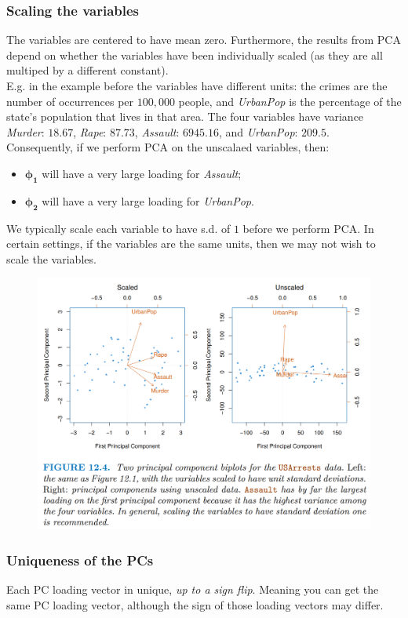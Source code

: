 \documentclass[11pt]{article}
\begin{document}
\subsubsection*{Scaling the variables}
\noindent The variables are centered to have mean zero. Furthermore, the results from PCA depend on whether the variables have been individually scaled (as they are all multiped by a different constant).\\

\noindent E.g. in the example before the variables have different units: the crimes are the number of occurrences per $100,000$ people, and \textit{UrbanPop} is the percentage of the state's population that lives in that area. The four variables have variance \textit{Murder}: $18.67$, \textit{Rape}: $87.73$, \textit{Assault}: $6945.16$, and \textit{UrbanPop}: $209.5$. \\

\noindent Consequently, if we perform PCA on the unscalaed variables, then:
\begin{itemize}
    \item $\boldsymbol{\phi_1}$ will have a very large loading for \textit{Assault};
    \item $\boldsymbol{\phi_2}$ will have a very large loading for \textit{UrbanPop}.
\end{itemize} \phantom{i}

\noindent We typically scale each variable to have s.d. of $1$ before we perform PCA. In certain settings, if the variables are the same units, then we may not wish to scale the variables.
\begin{figure}[H]
    \centering
    \includegraphics[width=0.6\linewidth]{Unsupervised - USArrests - Biplot Scaled vs Unscaled.png}
\end{figure}

\subsubsection*{Uniqueness of the PCs}
\noindent Each PC loading vector in unique, \textit{up to a sign flip}. Meaning you can get the same PC loading vector, although the sign of those loading vectors may differ. \\
\end{document}
